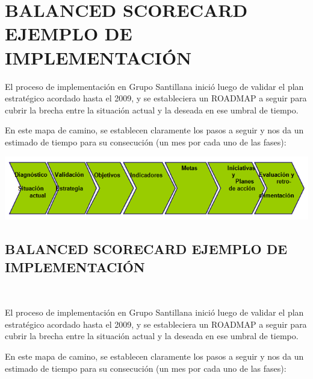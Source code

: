\section{BALANCED SCORECARD EJEMPLO DE IMPLEMENTACIÓN}
\item {El proceso de implementación en Grupo Santillana inició luego de validar  el plan estratégico acordado hasta el 2009, y se estableciera un ROADMAP a seguir para cubrir la brecha entre la situación actual y la deseada en ese umbral de tiempo.

En este mapa de camino, se establecen claramente los pasos a seguir y nos da un estimado de tiempo para su consecución (un mes por cada uno de las fases):}

\begin{center}
\includegraphics[width=15cm]{./Imagenes/ImagenEmpresa2.png}
\end{center}



\newpage
\begin{center}
\vspace*{0.1in}
\begin{Large}
\section{BALANCED SCORECARD EJEMPLO DE IMPLEMENTACIÓN} \\
\end{Large}
\end{center}


\item {El proceso de implementación en Grupo Santillana inició luego de validar  el plan estratégico acordado hasta el 2009, y se estableciera un ROADMAP a seguir para cubrir la brecha entre la situación actual y la deseada en ese umbral de tiempo.

En este mapa de camino, se establecen claramente los pasos a seguir y nos da un estimado de tiempo para su consecución (un mes por cada uno de las fases):}
